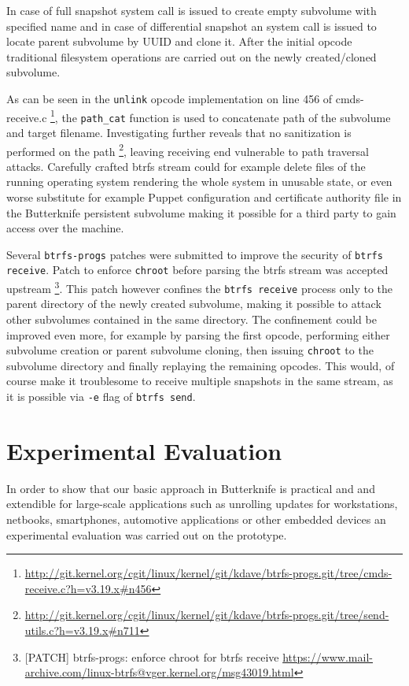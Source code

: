 \documentclass[a4paper,11pt]{kth-mag}
\begin{document}
In case of full snapshot system call is issued to
create empty subvolume with specified name and
in case of differential snapshot an system call is issued
to locate parent subvolume by UUID and clone it.
After the initial opcode traditional filesystem
operations are carried out on the newly
created/cloned subvolume.

As can be seen in the \lstinline!unlink! opcode
implementation on line 456 of cmds-receive.c
\footnote{\url{http://git.kernel.org/cgit/linux/kernel/git/kdave/btrfs-progs.git/tree/cmds-receive.c?h=v3.19.x\#n456}},
the \lstinline!path_cat! function is used to concatenate
path of the subvolume and target filename.
Investigating further reveals that no sanitization is performed on the path
\footnote{\url{http://git.kernel.org/cgit/linux/kernel/git/kdave/btrfs-progs.git/tree/send-utils.c?h=v3.19.x\#n711}}, leaving receiving end vulnerable to path traversal attacks.
Carefully crafted \acrshort{btrfs} stream could for example delete files
of the running operating system rendering the whole system
in unusable state, or even worse substitute for example
Puppet configuration and certificate authority file in the
Butterknife persistent subvolume making it possible for a third party
to gain access over the machine.

Several \lstinline!btrfs-progs! patches were submitted to improve
the security of \lstinline!btrfs receive!.
Patch to enforce \lstinline!chroot!
before parsing the \acrshort{btrfs} stream was accepted upstream
\footnote{
[PATCH] btrfs-progs: enforce chroot for btrfs receive
\url{https://www.mail-archive.com/linux-btrfs@vger.kernel.org/msg43019.html}}.
This patch however confines the \lstinline!btrfs receive!
process only to the parent directory of the newly created subvolume,
making it possible to attack other subvolumes contained in the same directory.
The confinement could be improved even more, for example
by parsing the first opcode, performing either
subvolume creation or parent subvolume cloning,
then issuing \lstinline!chroot! to the subvolume directory
and finally replaying the remaining opcodes.
This would, of course make it troublesome to receive multiple
snapshots in the same stream, as it is possible via \lstinline!-e!
flag of \lstinline!btrfs send!.



%
%
%
%
\chapter{Experimental Evaluation}
\label{chap:evaluation}
In order to show that our basic approach in Butterknife is practical and
and extendible for large-scale applications such as unrolling
updates for workstations, netbooks, smartphones,
automotive applications or other embedded devices
an experimental evaluation was carried out on the prototype.
\end{document}
